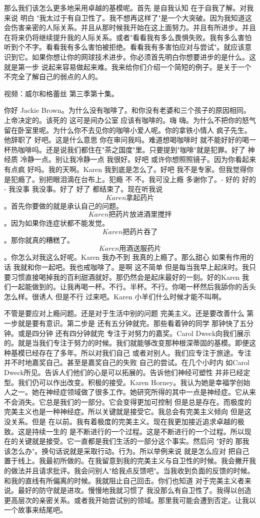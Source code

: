 那么我们该怎么更多地采用卓越的基模呢。首先 是自我认知 在于自我了解。对我来说 明白 "我太过于有自卫性了。我不想再这样了"是一个大突破。因为我知道这会伤害亲密的人际关系。并且从那时候我开始在这上面努力。并且有所进步。并且在将来仍将继续提升我的人际关系。或者"看看我有多么畏惧失败。我有多么害怕听到个不字。看看我有多么害怕被拒绝。看看我有多害怕应对与尝试"。就应该意识到它。如果你想让你的网球技术进步。你必须首先明白你想要进步的是什么。这就是第一步 说起来容易做起来难。我来给你们介绍一个简短的例子。是关于一个不完全了解自己的弱点的人的。 

视频：威尔和格蕾丝 第三季第十集。 

你好 Jackie Brown。为什么没有咖啡了。和你没有老婆和三个孩子的原因相同。上帝决定的。该死的 这可是间办公室 应该有咖啡的。嗨 嗨。为什么不把你的怒气留在卧室里呢。为什么你不去见你的咖啡小爱人呢。你的拿铁小情人 疯子先生。他辞职了 好吧。这是什么意思 你在审问我吗。难道想喝咖啡时 就不能好好的喝一杯热咖啡吗。还是说我们都住在"茶之国度"里。只要提到"咖啡"就是犯罪。好了 神经质 冷静一点。别让我冷静一点 我很好。好吧 或许你想照照镜子。因为你看起来有点疯 好吗。我的天啊。Karen 我到底是怎么了。好吧 我不是专家。但我觉得你是犯瘾了。别把眼泪滴在台布上。犯瘾 不 不。我可没上瘾 多谢你了。- 好的 好的 - 我没事 我没事。好了 好了 都结束了。现在听我说 \[Karen拿起药片\]。首先你要做的就是承认自己的问题。\[Karen把药片放进酒里搅拌\]。因为如果你连症状都不能发觉。\[Karen把药片吞了\]。那你就真的糟糕了。\[Karen用酒送服药片\]。你怎么对我这么好呢。Karen 我办不到 我真的上瘾了。那么甜心 如果有作用的话 我就和你一起吧。我也戒咖啡了。是啊 这不简单 但是每当我早上起床时。我只要习惯直接喝掉我的百利甜酒就好。那仍然会是起床最好的一刻。好的Karen 我们一起能做到的。让我再喝一杯。不行。半杯。不行。你喝一杯然后我舔你的舌头怎么样。很诱人 但是不行 过来吧。Karen 小羊们什么时候才能不叫啊。 

不管是要应对上瘾问题。还是对于生活中别的问题 完美主义。还是要改善什么 第一步就是要有意识。第二步是 还有五分钟就完。那些看着钟的同学 那钟快了五分钟。或是四分钟 还有四分钟就完 专注于对努力的嘉奖。Carol Dweck向我们展示的。就是当我们专注于努力的时候。我们就能够改变那种根深蒂固的基模。即便这种基模已经存在了多年。所以对我们自己 或者对别人。我们应专注于旅途。专注 并不时地嘉奖自己。甚至是嘉奖自己的失败 自己的尝试。在几个小时内 如Carol Dweck所见。告诉人们他们的心是可以拓展的。告诉他们神经可塑性 并非已经定型。我们仍可以作出改变。积极的接受。Karen Horney。我认为她是幸福学创始人之一。她在神经症领域做了很多工作。她研究所得的其中一点是神经症。它从来不会消失。它总是我们的一部分。它会变得更加可控制 但是总是存在。而极度的完美主义也是一种神经症。所以关键就是接受它。我总会有完美主义倾向 但是这没关系。但是 在以前。我有着极度的完美主义。现在我更加接近追求卓越的极致。这是持续一生的 是不断进行的一个过程。这是不断进行的一个过程。所以现在的关键就是接受。它一直都是我们生活的一部分这个事实。然后问 "好的 那我该怎么办"。换句话说就是采取行动。行为。所以举例来说 就是怎么应对 把自己置于线上。我最初所做的。在我留意到我的完美主义与自卫性的时候。我会撇开我的做法并且请求批评。我会问别人"给我点反馈吧"。当我收到负面的反馈的时候。和我的直线有所偏离的时候。我就阻止自己回击。你们也知道 对于完美主义者来说。最好的防守就是进攻。慢慢地我就习惯了 我没那么有自卫性了。我得以创造更高层次的亲密关系。或者我开始尝试别的领域。那里我可能会遭到否定。让我以一个故事来结尾吧。 

